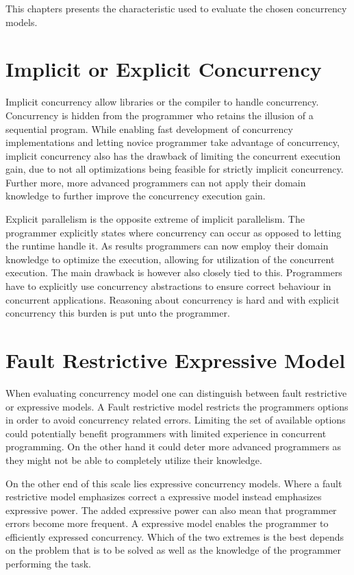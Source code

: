 \makeatletter {}\makeatother
{}
This chapters presents the characteristic used to evaluate the chosen concurrency models. 
\label{chap:char}
\section{Implicit or Explicit Concurrency}
Implicit concurrency allow libraries or the compiler to handle concurrency. Concurrency is hidden from the programmer who retains the illusion of a sequential program\cite[p. 59]{sutter2005software}. While enabling fast development of concurrency implementations and letting novice programmer take advantage of concurrency, implicit concurrency also has the drawback of limiting the concurrent execution gain, due to not all optimizations being feasible for strictly implicit concurrency. Further more, more advanced programmers can not apply their domain knowledge to further improve the concurrency execution gain.

Explicit parallelism is the opposite extreme of implicit parallelism. The programmer explicitly states where concurrency can occur as opposed to letting the runtime handle it\cite[p. 59]{sutter2005software}. As results programmers can now employ their domain knowledge to optimize the execution, allowing for utilization of the concurrent execution. The main drawback is however also closely tied to this. Programmers have to explicitly use concurrency abstractions to ensure correct behaviour in concurrent applications. Reasoning about concurrency is hard\cite[p. 56]{sutter2005software} and with explicit concurrency this burden is put unto the programmer.

\section{Fault Restrictive Expressive Model}
When evaluating concurrency model one can distinguish between fault restrictive or expressive models. A Fault restrictive model restricts the programmers options in order to avoid concurrency related errors. Limiting the set of available options could potentially benefit programmers with limited experience in concurrent programming. On the other hand it could deter more advanced programmers as they might not be able to completely utilize their knowledge.

On the other end of this scale lies expressive concurrency models. Where a fault restrictive model emphasizes correct a expressive model instead emphasizes expressive power. The added expressive power can also mean that programmer errors become more frequent. A expressive model enables the programmer to efficiently expressed concurrency. Which of the two extremes is the best depends on the problem that is to be solved as well as the knowledge of the programmer performing the task.
 
